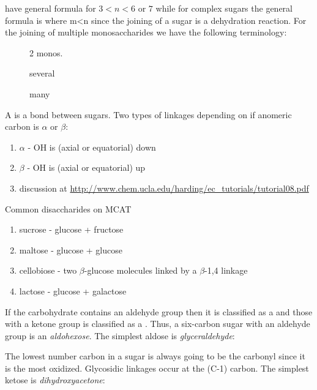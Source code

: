 \documentclass[../Bio_chemistryReview.tex]{subfiles}
\begin{document}
 have general formula  for $
3<n<\text{6 or 7} $ while for complex sugars the general formula is
 where m<n since the joining of a sugar is a dehydration
reaction. For the joining of multiple monosaccharides we have the following
terminology: 
\begin{description}
  \item[] 2 monos.
  \item[] several
  \item[] many
\end{description}
A  is a bond between sugars. Two types of linkages
depending on if anomeric carbon is $ \alpha \text{ or } \beta $:
\begin{enumerate}
  \item $\alpha$ - OH is (axial or equatorial) down
  \item $\beta$ - OH is (axial or equatorial) up
  \item discussion at
    \url{http://www.chem.ucla.edu/harding/ec_tutorials/tutorial08.pdf}
\end{enumerate}
Common disaccharides on MCAT
\begin{enumerate}
  \item sucrose - glucose + fructose
  \item maltose - glucose + glucose
  \item cellobiose - two $ \beta $-glucose molecules linked by a $ \beta $-1,4
    linkage 
  \item lactose - glucose + galactose 
\end{enumerate}
If the carbohydrate contains an aldehyde group then it is classified as a
 and those with a ketone group is classified as a
. Thus, a six-carbon sugar with an aldehyde group is an
\emph{aldohexose}. The simplest aldose is
\emph{glyceraldehyde}: 
\begin{center}
  \nobond{-[4,2,,,draw=none]}
  \setatomsep{2.5em}
\end{center}
The lowest number carbon in a sugar is always going to be the carbonyl since it
is the most oxidized. Glycosidic linkages occur at the (C-1) carbon.  
The simplest ketose is \emph{dihydroxyacetone}:
\end{document}
